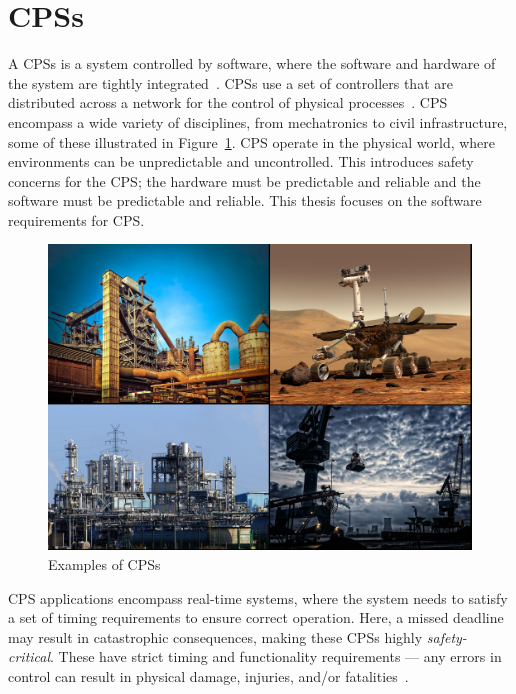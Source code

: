 \section{\acfp{CPS}}
A \acfp{CPS} is a system controlled by software, where the software and hardware of the system are tightly integrated~\cite{cps-design}.
\acp{CPS} use a set of controllers that are distributed across a network for the control of physical processes~\cite{alur2015principles}. 
\ac{CPS} encompass a wide variety of disciplines, from mechatronics to civil infrastructure, some of these illustrated in Figure~\ref{fig:cps}.
\ac{CPS} operate in the physical world, where environments can be unpredictable and uncontrolled.
This introduces safety concerns for the \ac{CPS}; the hardware must be predictable and reliable and the software must be predictable and reliable.
This thesis focuses on the software requirements for \ac{CPS}.

\begin{figure}[H]
	\centering
	\includegraphics[width=\textwidth]{Content/fig/1234.pdf}
	\caption{Examples of \acp{CPS}~\cite{industry-pic}~\cite{crane-pic}~\cite{rover-pic}~\cite{factory-pic} \label{fig:cps}}
\end{figure}

\ac{CPS} applications encompass real-time systems, where the system needs to satisfy a set of timing requirements to ensure correct operation. 
Here, a missed deadline may result in catastrophic consequences, making these \acp{CPS} highly \textit{safety-critical}. 
These have strict timing and functionality requirements --- any errors in control can result in physical damage, injuries, and/or fatalities~\cite{ANNDevModel1999}. 


